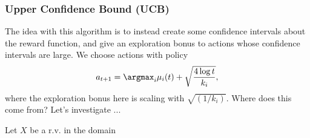 \subsubsection{Upper Confidence Bound (UCB)}

The idea with this algorithm is to instead create some confidence intervals about the reward function, and give an exploration bonus to actions whose confidence intervals are large. We choose actions with policy
\[a_{t+1} = \argmax_i \mu_i(t) + \sqrt{\frac{4\log t}{k_i}},\] 
where the exploration bonus here is scaling with $\sqrt{(1/k_i)}$. Where does this come from? Let's investigate ...

\begin{theorem}

Let $X$ be a r.v. in the domain 
\end{theorem}
